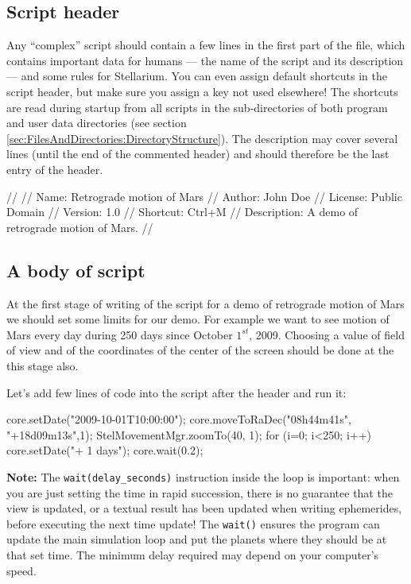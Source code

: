 \subsection{Script header}
Any ``complex'' script should contain a few lines in the first part of
the file, which contains important data for humans --- the name of the
script and its description --- and some rules for Stellarium. You can
even assign default shortcuts in the script header, but make sure you
assign a key not used elsewhere! The shortcuts are read during startup
from all scripts in the  sub-directories of both program
and user data directories (see section
\ref{sec:FilesAndDirectories:DirectoryStructure}).  The description
may cover several lines (until the end of the commented header) and
should therefore be the last entry of the header.

\begin{script}
//
// Name: Retrograde motion of Mars
// Author: John Doe
// License: Public Domain
// Version: 1.0
// Shortcut: Ctrl+M
// Description: A demo of retrograde motion of Mars.
//
\end{script}

\subsection{A body of script}
At the first stage of writing of the script for a demo of 
retrograde motion of Mars we should set some limits for 
our demo. For example we want to see motion of Mars every 
day during 250 days since October $1^{st}$,  2009. 
Choosing a value of field of view and of the coordinates 
of the center of the screen should be done at the this 
stage also. 

Let's add few lines of code into the script after the header 
and run it:
\begin{script}
core.setDate("2009-10-01T10:00:00");
core.moveToRaDec("08h44m41s", "+18d09m13s",1);
StelMovementMgr.zoomTo(40, 1);
for (i=0; i<250; i++)
{
      core.setDate("+ 1 days");
      core.wait(0.2);
}
\end{script}

\noindent\textbf{Note:}
The \texttt{wait(delay\_seconds)} instruction inside the loop is important: 
when you are just setting the time in rapid succession, there is no guarantee 
that the view is updated, or a textual result has been updated when writing ephemerides, 
before executing the next time update! 
The \texttt{wait()} ensures the program can update the main simulation loop and 
put the planets where they should be at that set time. 
The minimum delay required may depend on your computer's speed. 

